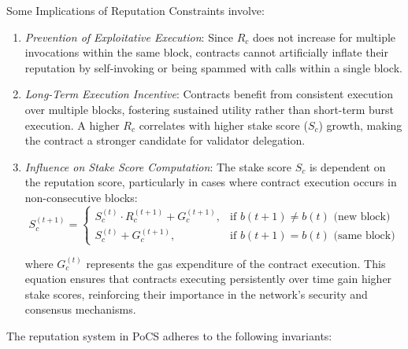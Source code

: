 \documentclass{article}
\begin{document}
Some Implications of Reputation Constraints involve:

\begin{enumerate}
    \item \textit{Prevention of Exploitative Execution}: Since \( R_c \) does not increase for multiple invocations within the same block, contracts cannot artificially inflate their reputation by self-invoking or being spammed with calls within a single block.
    \item \textit{Long-Term Execution Incentive}: Contracts benefit from consistent execution over multiple blocks, fostering sustained utility rather than short-term burst execution. A higher \( R_c \) correlates with higher stake score (\( S_c \)) growth, making the contract a stronger candidate for validator delegation.
    \item \textit{Influence on Stake Score Computation}: The stake score \( S_c \) is dependent on the reputation score, particularly in cases where contract execution occurs in non-consecutive blocks:
        \begin{equation}
        S_c^{(t+1)} =
        \begin{cases} 
        S_c^{(t)} \cdot R_c^{(t+1)} + G_c^{(t+1)}, & \text{if } b(t+1) \neq b(t) \text{ (new block)} \\
        S_c^{(t)} + G_c^{(t+1)}, & \text{if } b(t+1) = b(t) \text{ (same block)}
        \end{cases}
        \end{equation}

        where \( G_c^{(t)} \) represents the gas expenditure of the contract execution. This equation ensures that contracts executing persistently over time gain higher stake scores, reinforcing their importance in the network’s security and consensus mechanisms.

\end{enumerate}

The reputation system in PoCS adheres to the following invariants:
\end{document}

